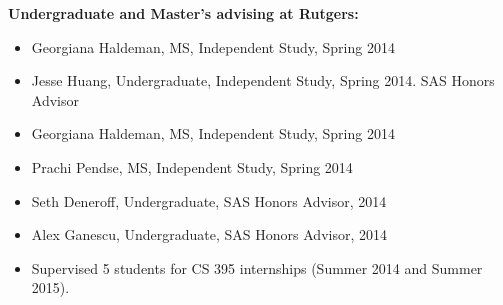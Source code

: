 \smallskip


\noindent\textbf{Undergraduate and Master's advising at Rutgers:}
\begin{itemize}
    \item Georgiana Haldeman, MS, Independent Study, Spring 2014
    \item Jesse Huang, Undergraduate, Independent Study, Spring 2014.  SAS Honors Advisor
    \item Georgiana Haldeman, MS, Independent Study, Spring 2014
    \item Prachi Pendse, MS, Independent Study, Spring 2014
    \item Seth Deneroff, Undergraduate, SAS Honors Advisor, 2014
    \item Alex Ganescu, Undergraduate, SAS Honors Advisor, 2014
    \item Supervised 5 students for CS 395 internships (Summer 2014 and Summer 2015).
\end{itemize}

